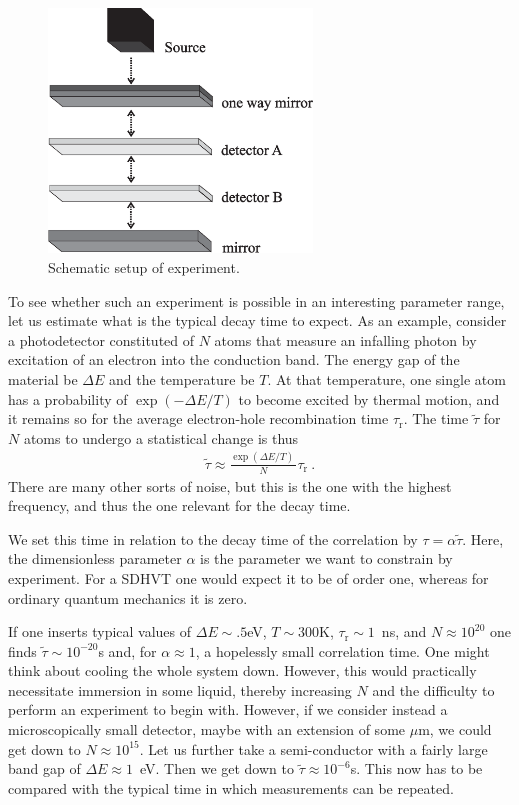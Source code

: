 \documentclass[12pt]{article}                    %
\newcommand{\beqn}{\begin{eqnarray}}
\newcommand{\eeqn}{\end{eqnarray}}
\begin{document}
\begin{figure} 
\vspace*{-0.0cm}
\includegraphics[width=7cm]{exp.eps}
 
\caption{Schematic setup of experiment.
\label{fig2}}
\end{figure} 



To see whether such an experiment is possible in an interesting parameter range, 
let us estimate what is the typical decay time to 
expect.
As an example, consider a photodetector constituted of $N$ atoms that measure an infalling
photon by excitation of an electron into the conduction band. The energy gap of the 
material be $\Delta E$ and the temperature be $T$.
At that temperature, one single atom has a probability of $\exp(-\Delta E/T)$
to become excited by thermal motion, and it remains so for the average 
electron-hole recombination time $\tau_{\mathrm r}$. The 
time $\tilde \tau$ for $N$ atoms to undergo a statistical change is thus
\beqn
\tilde \tau \approx \frac{\exp(\Delta E/T)~ }{N} \tau_{\mathrm r} ~.
\eeqn
There are many other sorts of noise, but this is the one with the highest
frequency, and thus the one relevant for the decay time.

We set this time in relation to the decay time of the correlation by 
$\tau = \alpha \tilde \tau$. Here, the dimensionless parameter $\alpha$ is the parameter 
we want to constrain by experiment. For a {\sc SDHVT} one would expect it to
be of order one, whereas for ordinary quantum mechanics it is zero.

If one inserts typical values of $\Delta E \sim .5$eV, $T \sim 300$K, $\tau_{\mathrm r} \sim 1$~ns,
and $N \approx 10^{20}$ one finds $\tilde \tau \sim 10^{-20}$s and,
for $\alpha \approx 1$, a hopelessly
small correlation time. One might think about cooling the whole
system down. However, this would practically necessitate immersion in some
liquid, thereby increasing $N$ and the difficulty to perform an experiment
to begin with. However, if we consider instead a microscopically small detector,
maybe with an extension of some $\mu$m, we could get down to 
$N \approx 10^{15}$. Let us further take
a semi-conductor with a fairly large band gap of $\Delta E \approx 1$~eV.
Then we get down to $\tilde \tau \approx 10^{-6}$s. This now has to be
compared with the typical time in which measurements can be repeated. 
\end{document}
